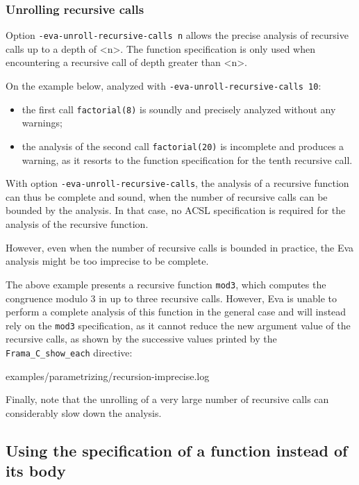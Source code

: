 \documentclass[web]{frama-c-book}
\newcommand{\Eva}{\textsf{Eva}}
\begin{document}
\subsubsection{Unrolling recursive calls}

Option \lstinline|-eva-unroll-recursive-calls n| allows the precise analysis
of recursive calls up to a depth of <n>. The function specification is only used
when encountering a recursive call of depth greater than <n>.

On the example below, analyzed with \lstinline|-eva-unroll-recursive-calls 10|:
\begin{itemize}
\item
  the first call \lstinline|factorial(8)| is soundly and precisely analyzed
  without any warnings;
\item
  the analysis of the second call \lstinline|factorial(20)| is incomplete and
  produces a warning, as it resorts to the function specification for the tenth
  recursive call.
\end{itemize}



With option \lstinline|-eva-unroll-recursive-calls|,
the analysis of a recursive function can thus be complete and sound,
when the number of recursive calls can be bounded by the analysis.
In that case, no ACSL specification is required for the analysis of the
recursive function.

However, even when the number of recursive calls is bounded in practice,
the \Eva{} analysis might be too imprecise to be complete.



The above example presents a recursive function \lstinline|mod3|, which
computes the congruence modulo 3 in up to three recursive calls.
However, Eva is unable to perform a complete analysis of this function
in the general case and will instead rely on the \lstinline|mod3| specification,
as it cannot reduce the new argument value of the recursive calls, as shown
by the successive values printed by the \lstinline|Frama_C_show_each| directive:


                {examples/parametrizing/recursion-imprecise.log}

Finally, note that the unrolling of a very large number of recursive calls can
considerably slow down the analysis.


\subsection{Using the specification of a function instead of its body}
\label{val-use-spec}
\end{document}
